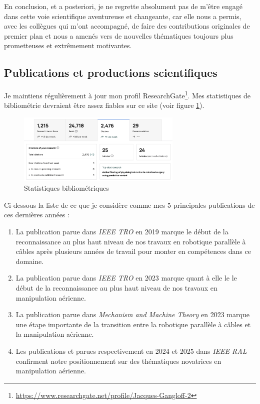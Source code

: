 \documentclass[a4paper,12pt]{article}
\begin{document}
En conclusion, et a posteriori, je ne regrette absolument pas de m’être engagé dans cette voie scientifique aventureuse et changeante, car elle nous a permis, avec les collègues qui m'ont accompagné, de faire des contributions originales de premier plan et nous a amenés vers de nouvelles thématiques toujours plus prometteuses et extrêmement motivantes.


\subsection{Publications et productions scientifiques }


Je maintiens régulièrement à jour mon profil ResearchGate\footnote{\url{https://www.researchgate.net/profile/Jacques-Gangloff-2}}. Mes statistiques de bibliométrie devraient être assez fiables sur ce site (voir figure \ref{fig:stats}).

\begin{figure}[H]
\centering
\includegraphics[width=0.7\textwidth]{stats_RG.png}
\caption{Statistiques bibliométriques}
\label{fig:stats}
\end{figure}

Ci-dessous la liste de ce que je considère comme mes 5 principales publications de ces dernières années :
\begin{enumerate}
    \item La publication \cite{2-BCLG19} parue dans \textit{IEEE TRO} en 2019 marque le début de la reconnaissance au plus haut niveau de nos travaux en robotique parallèle à câbles après plusieurs années de travail pour monter en compétences dans ce domaine.
    \item La publication \cite{2-YCAD23} parue dans \textit{IEEE TRO} en 2023 marque quant à elle le le début de la reconnaissance au plus haut niveau de nos travaux en manipulation aérienne.
    \item La publication \cite{2-CAYD23} parue dans \textit{Mechanism and Machine Theory} en 2023 marque  une étape importante de la transition entre la robotique parallèle à câbles et la manipulation aérienne.
    \item Les publications \cite{2-NDCD24} et \cite{2-ANCDxx} parues respectivement en 2024 et 2025 dans \textit{IEEE RAL} confirment notre positionnement sur des thématiques novatrices en manipulation aérienne. 
\end{enumerate}
\end{document}
